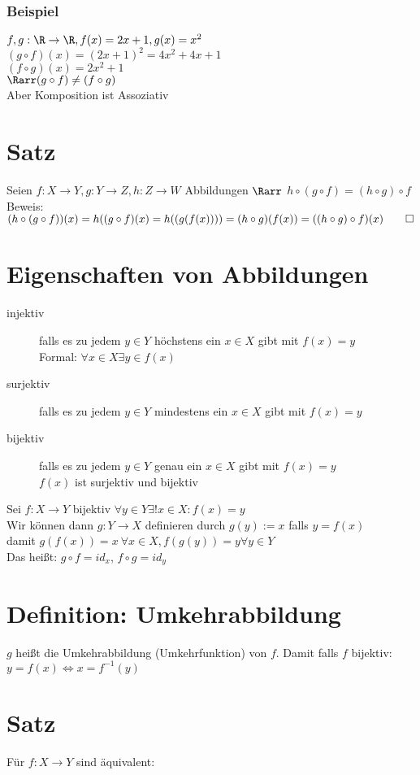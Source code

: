 \subsubsection*{Beispiel}
$f, g: \R \to \R, f(x) = 2x+1 , g(x) = x^2$\\
$(g \circ f)(x) = (2x+1)^2 = 4x^2 + 4x + 1$\\
$(f \circ g)(x) = 2x^2 + 1$\\
$\Rarr (g \circ f) \neq (f \circ g)$\\
Aber Komposition ist Assoziativ
\section{Satz}
Seien $f:X\to Y, g:Y\to Z, h:Z\to W$ Abbildungen $\Rarr$ $h \circ (g \circ f) = (h \circ g) \circ f$\\
Beweis: $(h\circ (g\circ f))(x) = h((g\circ f)(x) = h((g(f(x)))) = (h \circ g)(f(x)) = ((h \circ g) \circ f)(x) \qed$
\section{Eigenschaften von Abbildungen}
\begin{description}
\item[injektiv] falls es zu jedem $y \in Y$ höchstens ein $x \in X$ gibt mit $f(x) = y$\\
Formal: $\forall x \in X \exists y \in f(x)$
\item[surjektiv] falls es zu jedem $y \in Y$ mindestens ein $x \in X$ gibt mit $f(x) = y$
\item[bijektiv] falls es zu jedem $y \in Y$ genau ein $x \in X$ gibt mit $f(x) = y$\\
$f(x)$ ist surjektiv und bijektiv
\end{description}
Sei $f:X\to Y$ bijektiv $\forall y\in Y \exists! x\in X: f(x) = y$\\
Wir können dann $g: Y\to X$ definieren durch $g(y) := x$ falls $y = f(x)$\\
damit $g(f(x)) = x\ \forall x\in X, f(g(y)) = y \forall y\in Y$\\
Das heißt: $g\circ f = id_x$, $f \circ g = id_y$
\section{Definition: Umkehrabbildung}
$g$ heißt die Umkehrabbildung (Umkehrfunktion) von $f$. 
Damit falls $f$ bijektiv: $y = f(x) \Leftrightarrow x = f^{-1}(y)$
\section{Satz}
Für $f: X\to Y$ sind äquivalent:

